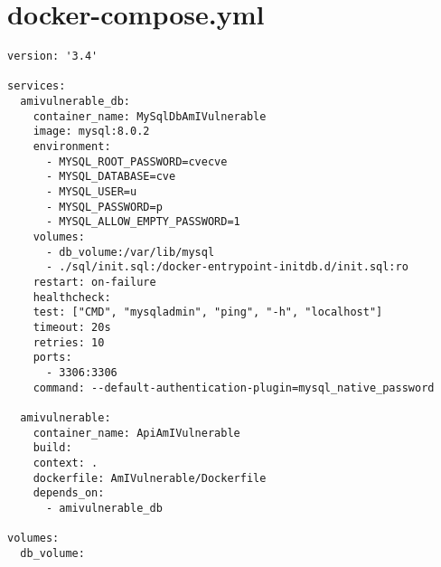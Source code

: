 \section{docker-compose.yml} \label{sec:dockerComposeYml}
    \begin{lstlisting}[style=yaml]
version: '3.4'

services:
  amivulnerable_db:
    container_name: MySqlDbAmIVulnerable
    image: mysql:8.0.2
    environment:
      - MYSQL_ROOT_PASSWORD=cvecve
      - MYSQL_DATABASE=cve
      - MYSQL_USER=u
      - MYSQL_PASSWORD=p
      - MYSQL_ALLOW_EMPTY_PASSWORD=1
    volumes:
      - db_volume:/var/lib/mysql
      - ./sql/init.sql:/docker-entrypoint-initdb.d/init.sql:ro
    restart: on-failure
    healthcheck:
    test: ["CMD", "mysqladmin", "ping", "-h", "localhost"]
    timeout: 20s
    retries: 10
    ports:
      - 3306:3306
    command: --default-authentication-plugin=mysql_native_password

  amivulnerable:
    container_name: ApiAmIVulnerable
    build:
    context: .
    dockerfile: AmIVulnerable/Dockerfile
    depends_on:
      - amivulnerable_db

volumes:
  db_volume:
    \end{lstlisting}

